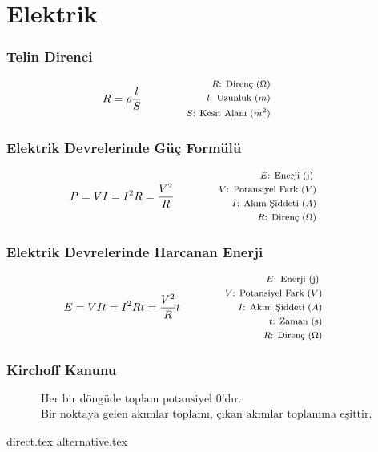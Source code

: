 \section{Elektrik}

\subsubsection*{Telin Direnci}
\begin{equation}
    R = \rho \frac{l}{S} \qquad \qquad \parbox{4cm}{\footnotesize$\begin{aligned}
        R\text{: Direnç } (\Omega) \\
        l\text{: Uzunluk } (m) \\
        S\text{: Kesit Alanı } (m^2)
\end{aligned}$}
\end{equation}

\subsubsection*{Elektrik Devrelerinde Güç Formülü}
\begin{equation}
    P = VI = I^2 R = \frac{V^2}{R} \qquad \qquad \parbox{4cm}{\footnotesize$\begin{aligned}
        E\text{: Enerji (j) } \\
        V\text{: Potansiyel Fark } (V) \\
        I\text{: Akım Şiddeti } (A) \\
        R\text{: Direnç } (\Omega)
\end{aligned}$}
\end{equation}

\subsubsection*{Elektrik Devrelerinde Harcanan Enerji}
\begin{equation}
    E = VIt = I^2Rt = \frac{V^2}{R}t \qquad \qquad \parbox{4cm}{\footnotesize$\begin{aligned}
        E\text{: Enerji (j) } \\
        V\text{: Potansiyel Fark } (V) \\
        I\text{: Akım Şiddeti } (A) \\
        t\text{: Zaman (s)} \\
        R\text{: Direnç } (\Omega)
\end{aligned}$}
\end{equation}

\subsubsection*{Kirchoff Kanunu}
\begin{equation*}
  \begin{aligned}
    \text{Her bir döngüde toplam potansiyel 0'dır. } \\
    \text{Bir noktaya gelen akımlar toplamı, çıkan akımlar toplamına eşittir. }
    \end{aligned}
\end{equation*}

\newpage
{direct.tex}
\newpage
{alternative.tex}
